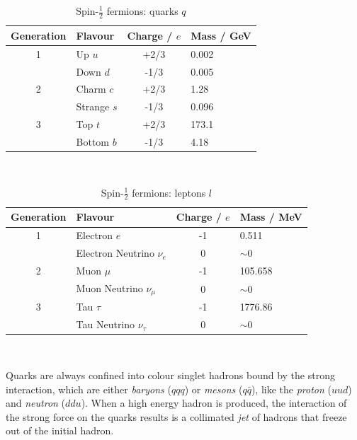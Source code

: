		\begin{table}[ht]
			\caption{Spin-$\frac{1}{2}$ fermions: quarks $q$ \cite{pdg}}
			\label{t:tab:quark}
			\medskip
			\centering
			\begin{tabular}{clcl}\toprule
				Generation & Flavour & Charge / $e$ & Mass / GeV \\\midrule
				1    &     Up $u$      &    +2/3   & 0.002\\
	    &     Down $d$    &    -1/3   & 0.005\\
		    	2    &     Charm $c$      &    +2/3   & 1.28\\
		    	&     Strange $s$    &    -1/3   & 0.096\\
				3    &     Top $t$  &   +2/3   & 173.1\\
	    &     Bottom $b$   &   -1/3   & 4.18\\\bottomrule
			\end{tabular}\\[5pt]
		\end{table}
		\begin{table}[ht]
			\caption{Spin-$\frac{1}{2}$ fermions: leptons $l$ \cite{pdg}}
			\label{t:tab:lepton}
			\medskip
			\centering
			\begin{tabular}{clcl}\toprule
				Generation & Flavour & Charge / $e$ & Mass / MeV\\\midrule
				1    &     Electron $e$      &    -1   & 0.511\\
				&     Electron Neutrino $\nu_e$    &   0  & $\sim$0\\
				2    &     Muon $\mu$      &    -1   & 105.658\\
				&     Muon Neutrino $\nu_\mu$    &    0   & $\sim$0\\
				3    &     Tau $\tau$  &   -1   & 1776.86\\
				&     Tau Neutrino $\nu_\tau$   &   0   & $\sim$0\\\bottomrule
			\end{tabular}\\[5pt]
		\end{table}
		
		Quarks are always confined into colour singlet hadrons bound by the strong interaction, which are either \textit{baryons} ($qqq$) or \textit{mesons} ($q\bar{q}$), like the \textit{proton} ($uud$) and \textit{neutron} ($ddu$). When a high energy hadron is produced, the interaction of the strong force on the quarks results is a collimated \textit{jet} of hadrons that freeze out of the initial hadron. 
		
